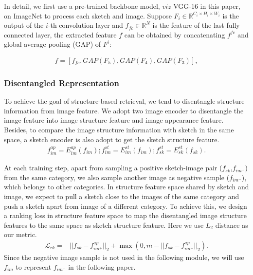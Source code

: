 \documentclass[10pt,twocolumn,letterpaper]{article}
\begin{document}
In detail, we first use a pre-trained backbone model, $viz$ VGG-16 in this paper, on ImageNet \cite{deng2009imagenet} to process each sketch and image. 
Suppose $F_i \in \mathbb{R}^{C_i \times H_i \times W_i}$ is the output of the $i$-th convolution layer and $f_{fc} \in \mathbb{R}^{N}$ is the feature of the last fully connected layer, the extracted feature $f$ can be obtained by concatenating $f^{fc}$ and global average pooling (GAP) of $F^i$:

\begin{align}
f\!=\![f_{fc}, GAP(F_5), GAP(F_4), GAP(F_3)],
\end{align}

\subsubsection{Disentangled Representation}
To achieve the goal of structure-based retrieval, we tend to disentangle structure information from image feature. 
We adopt two image encoder to disentangle the image feature into image structure feature and image appearance feature. Besides, to compare the image structure information with sketch in the same space, a sketch encoder is also adopt to get the sketch structure feature. 
\begin{align}
    f_{im}^{ap} \!=\! E_{im}^{ap}(f_{im}); f_{im}^{st} \!=\! E_{im}^{st}(f_{im}); f_{sk}^{st} \!=\! E_{sk}^{st}(f_{sk}).
\end{align}

At each training step, apart from sampling a positive sketch-image pair ($f_{sk}$,$f_{im^{+}}$) from the same category, we also sample another image as negative sample ($f_{im^{-}}$), which belongs to other categories. In structure feature space shared by sketch and image, we expect to pull a sketch close to the images of the same category and push a sketch apart from image of a different category. To achieve this, we design a ranking loss in structure feature space to map the disentangled image structure features to the same space as sketch structure feature. Here we use $L_2$ distance as our metric.
\begin{equation}
    \begin{aligned}
        \mathcal{L}_{rk} =& ||f_{sk}\!-\!f_{im^{\!+\!}}^{ap}||_{2}\!+\!\max(0,\!m\!-\!||f_{sk}\!-\!f_{im^{\!-\!}}^{ap}||_{2}).
    \end{aligned}
\end{equation}
Since the negative image sample is not used in the following module, we will use $f_{im}$ to represent $f_{im^{+}}$ in the following paper.
\end{document}
